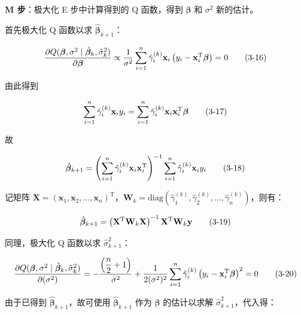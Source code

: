 \documentclass[12pt,a4paper]{ctexart}
\makeatletter
\numberwithin{figure}{section}
\numberwithin{table}{section}
\let\ltx@orig@tag\tag
\renewcommand{\tag}[1]{\refstepcounter{equation}\ltx@orig@tag{#1}}%
\makeatother
\begin{document}
\textbf{M 步}：极大化 E 步中计算得到的 Q 函数，得到 $\boldsymbol{\beta}$ 和 $\sigma^2$ 新的估计。

首先极大化 Q 函数以求 $\hat{\boldsymbol{\beta}}_{k+1}$：

\begin{equation}
\frac{\partial Q(\boldsymbol{\beta}, \sigma^2 \mid \hat{\boldsymbol{\beta}}_k, \hat{\sigma}_k^2)}{\partial \boldsymbol{\beta}} \propto \frac{1}{\sigma^2}\sum_{i=1}^{n} \hat{\gamma}_i^{(k)} \mathbf{x}_i\left(y_i - \mathbf{x}_i^{\mathrm{T}} \boldsymbol{\beta}\right) = 0 \tag{3-16}
\end{equation}

由此得到

\begin{equation}
\sum_{i=1}^{n} \hat{\gamma}_i^{(k)} \mathbf{x}_i y_i = \sum_{i=1}^{n} \hat{\gamma}_i^{(k)} \mathbf{x}_i \mathbf{x}_i^{\mathrm{T}} \boldsymbol{\beta} \tag{3-17}
\end{equation}

故

\begin{equation}
\hat{\boldsymbol{\beta}}_{k+1} = \left(\sum_{i=1}^{n} \hat{\gamma}_i^{(k)} \mathbf{x}_i \mathbf{x}_i^{\mathrm{T}}\right)^{-1} \sum_{i=1}^{n} \hat{\gamma}_i^{(k)} \mathbf{x}_i y_i \tag{3-18}
\end{equation}

记矩阵 $\mathbf{X} = (\mathbf{x}_1, \mathbf{x}_2, \ldots, \mathbf{x}_n)^{\mathrm{T}}$，$\mathbf{W}_k = \mathrm{diag}\!\left(\hat{\gamma}_1^{(k)}, \hat{\gamma}_2^{(k)}, \ldots, \hat{\gamma}_n^{(k)}\right)$，则有：

\begin{equation}
\hat{\boldsymbol{\beta}}_{k+1} = \left(\mathbf{X}^{\mathrm{T}} \mathbf{W}_k \mathbf{X}\right)^{-1} \mathbf{X}^{\mathrm{T}} \mathbf{W}_k \mathbf{y} \tag{3-19}
\end{equation}

同理，极大化 Q 函数以求 $\hat{\sigma}_{k+1}^2$：

\begin{equation}
\frac{\partial Q(\boldsymbol{\beta}, \sigma^2 \mid \hat{\boldsymbol{\beta}}_k, \hat{\sigma}_k^2)}{\partial (\sigma^2)} = -\frac{\left(\dfrac{n}{2}+1\right)}{\sigma^2} + \frac{1}{2(\sigma^2)^2}\sum_{i=1}^{n} \hat{\gamma}_i^{(k)}\left(y_i - \mathbf{x}_i^{\mathrm{T}} \boldsymbol{\beta}\right)^2 = 0 \tag{3-20}
\end{equation}

由于已得到 $\hat{\boldsymbol{\beta}}_{k+1}$，故可使用 $\hat{\boldsymbol{\beta}}_{k+1}$ 作为 $\boldsymbol{\beta}$ 的估计以求解 $\hat{\sigma}_{k+1}^2$，代入得：
\end{document}
